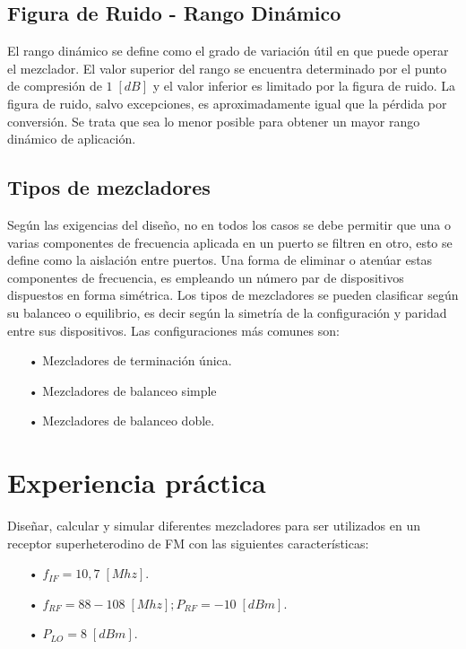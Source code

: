 \documentclass[twocolumn]{article}
\begin{document}
\subsection{Figura de Ruido - Rango Dinámico}
 El rango dinámico se define como el grado de variación útil en que puede operar el mezclador. El valor superior del rango se encuentra determinado por el punto de compresión de $1 \; [dB]$ y el valor inferior es limitado por la figura de ruido. La figura de ruido, salvo excepciones, es aproximadamente igual que la pérdida por conversión. Se trata que sea lo menor posible para obtener un mayor rango dinámico de aplicación.

\subsection{Tipos de mezcladores}  
Según las exigencias del diseño, no en todos los casos se debe permitir que una o varias componentes de frecuencia aplicada en un puerto se filtren en otro, esto se define como la aislación entre puertos. Una forma de eliminar o atenúar estas componentes de frecuencia, es empleando un número par de dispositivos dispuestos en forma simétrica. Los tipos de mezcladores se pueden clasificar según su balanceo o equilibrio, es decir según la simetría de la configuración y paridad entre sus dispositivos. Las configuraciones más comunes son:

\begin{itemize}\itemsep0em
\item[•]  Mezcladores de terminación única.
\item[•]  Mezcladores de balanceo simple
\item[•]  Mezcladores de balanceo doble.
\end{itemize}

\clearpage

\section{Experiencia práctica}
Diseñar, calcular y simular diferentes mezcladores para ser utilizados en un receptor superheterodino de FM con las siguientes características:

\begin{itemize}\itemsep0em
\item[•]  $f_{IF} = 10,7 \; [Mhz]$.
\item[•]  $f_{RF} = 88-108 \; [Mhz]; P_{RF} = -10 \; [dBm]$.
\item[•]  $P_{LO} = 8 \;[dBm]$.
\end{itemize}
\end{document}
